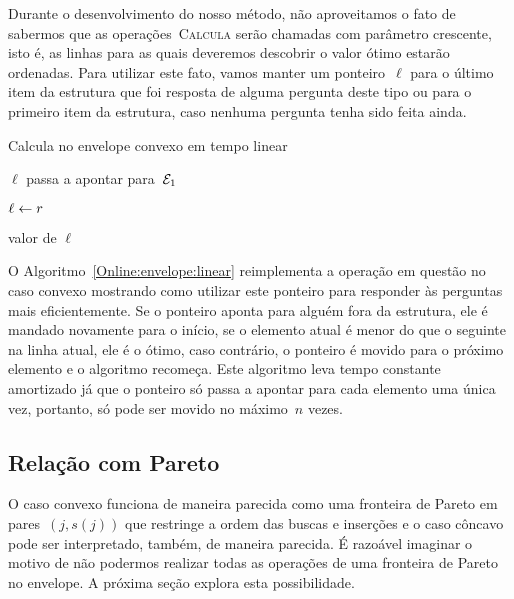 Durante o desenvolvimento do nosso método, não aproveitamos o fato de sabermos que as operações~\textsc{Calcula} serão chamadas com parâmetro crescente, isto é, as linhas para as quais deveremos descobrir o valor ótimo estarão ordenadas. Para utilizar este fato, vamos manter um ponteiro~$\ell$ para o último item da estrutura que foi resposta de alguma pergunta deste tipo ou para o primeiro item da estrutura, caso nenhuma pergunta tenha sido feita ainda. 

\begin{algorithm}[h]
\caption{Calcula no envelope convexo em tempo linear}
\label{Online:envelope:linear}
\begin{algorithmic}[1]
        \State $\ell$ passa a apontar para~$\mathcal{E}_1$
    \EndIf
    
        \State $\ell \leftarrow r$
    \EndWhile

    \State \Return valor de $\ell$
\EndFunction
\end{algorithmic}
\end{algorithm}

O Algoritmo~\ref{Online:envelope:linear} reimplementa a operação em questão no caso convexo mostrando como utilizar este ponteiro para responder às perguntas mais eficientemente. Se o ponteiro aponta para alguém fora da estrutura, ele é mandado novamente para o início, se o elemento atual é menor do que o seguinte na linha atual, ele é o ótimo, caso contrário, o ponteiro é movido para o próximo elemento e o algoritmo recomeça. Este algoritmo leva tempo constante amortizado já que o ponteiro só passa a apontar para cada elemento uma única vez, portanto, só pode ser movido no máximo~$n$ vezes.


\subsection{Relação com Pareto}

O caso convexo funciona de maneira parecida como uma fronteira de Pareto em pares~$(j,s(j))$ que restringe a ordem das buscas e inserções e o caso côncavo pode ser interpretado, também, de maneira parecida. É razoável imaginar o motivo de não podermos realizar todas as operações de uma fronteira de Pareto no envelope. A próxima seção explora esta possibilidade.
